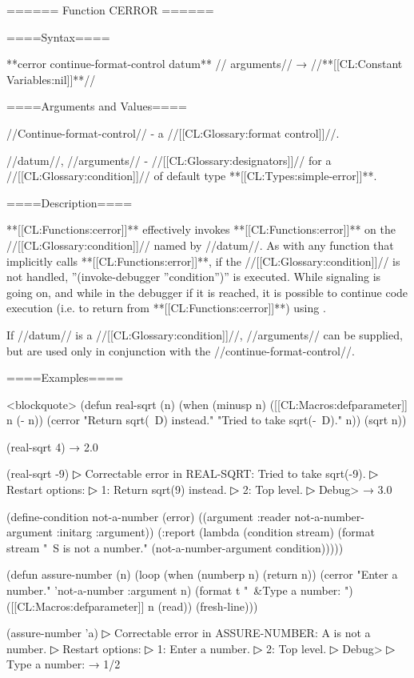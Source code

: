 ====== Function CERROR ======

====Syntax====

**cerror {continue-format-control datum** //\rest} arguments// → //**[[CL:Constant Variables:nil]]**//

====Arguments and Values====

//Continue-format-control// - a //[[CL:Glossary:format control]]//.


//datum//, //arguments// - //[[CL:Glossary:designators]]// for a //[[CL:Glossary:condition]]// of default type **[[CL:Types:simple-error]]**.

====Description====

**[[CL:Functions:cerror]]** effectively invokes **[[CL:Functions:error]]** on the //[[CL:Glossary:condition]]// named by //datum//. As with any function that implicitly calls **[[CL:Functions:error]]**, if the //[[CL:Glossary:condition]]// is not handled, ''(invoke-debugger ''condition'')'' is executed. While signaling is going on, and while in the debugger if it is reached, it is possible to continue code execution (i.e. to return from **[[CL:Functions:cerror]]**) using .

If //datum// is a //[[CL:Glossary:condition]]//, //arguments// can be supplied, but are used only in conjunction with the //continue-format-control//.

====Examples====

<blockquote> (defun real-sqrt (n) (when (minusp n) ([[CL:Macros:defparameter]] n (- n)) (cerror "Return sqrt(~D) instead." "Tried to take sqrt(-~D)." n)) (sqrt n))

(real-sqrt 4) → 2.0

(real-sqrt -9)
▷ Correctable error in REAL-SQRT: Tried to take sqrt(-9).
▷ Restart options:
▷ 1: Return sqrt(9) instead.
▷ 2: Top level.
▷ Debug>  → 3.0

(define-condition not-a-number (error) ((argument :reader not-a-number-argument :initarg :argument)) (:report (lambda (condition stream) (format stream "~S is not a number." (not-a-number-argument condition)))))

(defun assure-number (n) (loop (when (numberp n) (return n)) (cerror "Enter a number." 'not-a-number :argument n) (format t "~&Type a number: ") ([[CL:Macros:defparameter]] n (read)) (fresh-line)))

(assure-number 'a)
▷ Correctable error in ASSURE-NUMBER: A is not a number.
▷ Restart options:
▷ 1: Enter a number.
▷ 2: Top level.
▷ Debug> 
▷ Type a number:  → 1/2

